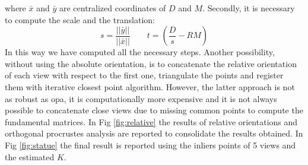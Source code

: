 \documentclass[11pt]{article}
\begin{document}
where $\bar{x}$ and $\bar{y}$ are centralized coordinates of $D$ and $M$.
Secondly, it is necessary to compute the scale and the translation:
\begin{equation}
    s = \frac{||\bar{y}||}{||\bar{x}||} \qquad t=\left(\frac{D}{s} - RM\right)
\end{equation}
In this way we have computed all the necessary steps. Another possibility, without using the absolute orientation, is to concatenate the relative orientation of each view with respect to the first one, triangulate the points and register them with iterative closest point algorithm. However, the latter approach is not as robust as opa, it is computationally more expensive and it is not always possible to concatenate close views due to missing common points to compute the fundamental matrices.
In Fig \ref{fig:relative} the results of relative orientations and orthogonal procrustes analysis are reported to consolidate the results obtained. In Fig \ref{fig:statue} the final result is reported using the inliers points of 5 views and the estimated $K$.
\bigskip
\bigskip
\end{document}

